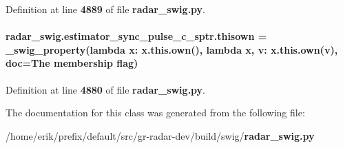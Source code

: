 Definition at line {\bf 4889} of file {\bf radar\+\_\+swig.\+py}.

\paragraph[{thisown}]{\setlength{\rightskip}{0pt plus 5cm}radar\+\_\+swig.\+estimator\+\_\+sync\+\_\+pulse\+\_\+c\+\_\+sptr.\+thisown = {\bf \+\_\+swig\+\_\+property}(lambda x\+: x.\+this.\+own(), lambda {\bf x}, v\+: x.\+this.\+own(v), doc=\textquotesingle{}The membership flag\textquotesingle{})\hspace{0.3cm}{\ttfamily [static]}}\label{classradar__swig_1_1estimator__sync__pulse__c__sptr_a1e2fdf31bd276296e77d6b05987682d9}


Definition at line {\bf 4880} of file {\bf radar\+\_\+swig.\+py}.



The documentation for this class was generated from the following file\+:\begin{DoxyCompactItemize}
\item 
/home/erik/prefix/default/src/gr-\/radar-\/dev/build/swig/{\bf radar\+\_\+swig.\+py}\end{DoxyCompactItemize}
